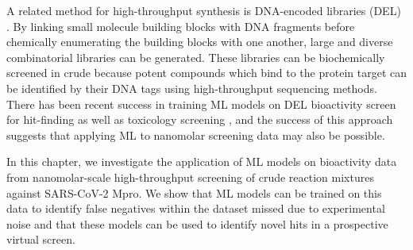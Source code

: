 A related method for high-throughput synthesis is DNA-encoded libraries (DEL) \cite{GirondaMartinez2021DNALibrary}. By linking small molecule building blocks with DNA fragments before chemically enumerating the building blocks with one another, large and diverse combinatorial libraries can be generated. These libraries can be biochemically screened in crude because potent compounds which bind to the protein target can be identified by their DNA tags using high-throughput sequencing methods. There has been recent success in training ML models on DEL bioactivity screen for hit-finding \cite{McCloskey2020DNALibrary, Lim2022DELCountML} as well as toxicology screening \cite{Blay20221DELTox}, and the success of this approach suggests that applying ML to nanomolar screening data may also be possible.

In this chapter, we investigate the application of ML models on bioactivity data from nanomolar-scale high-throughput screening of crude reaction mixtures against SARS-CoV-2 Mpro. We show that ML models can be trained on this data to identify false negatives within the dataset missed due to experimental noise and that these models can be used to identify novel hits in a prospective virtual screen.



